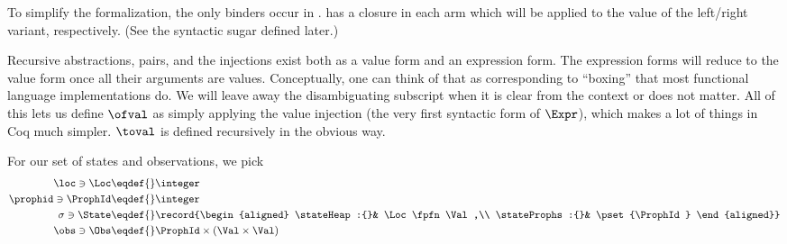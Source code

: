To simplify the formalization, the only binders occur in .
 has a closure in each arm which will be applied to the value of the left/right variant, respectively.
(See the syntactic sugar defined later.)

Recursive abstractions, pairs, and the injections exist both as a value form and an expression form.
The expression forms will reduce to the value form once all their arguments are values.
Conceptually, one can think of that as corresponding to ``boxing'' that most functional language implementations do.
We will leave away the disambiguating subscript when it is clear from the context or does not matter.
All of this lets us define $\ofval$ as simply applying the value injection (the very first syntactic form of $\Expr$), which makes a lot of things in Coq much simpler.
$\toval$ is defined recursively in the obvious way.

For our set of states and observations, we pick
\begin{align*}
  \loc \ni \Loc \eqdef{}& \integer \\
  \prophid \ni \ProphId \eqdef{}& \integer \\
  \sigma \ni \State \eqdef{}& \record{\begin{aligned}
                   \stateHeap:{}& \Loc \fpfn \Val,\\
                   \stateProphs:{}& \pset{\ProphId}
                 \end{aligned}} \\
  \obs \ni \Obs \eqdef{}& \ProphId \times (\Val \times \Val)
\end{align*}

